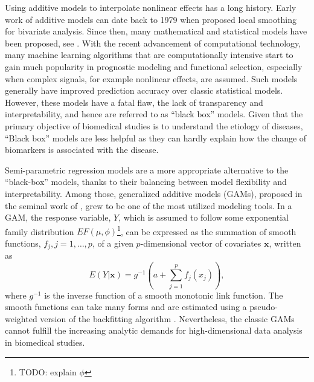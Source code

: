 \documentclass[AMA,STIX1COL,]{WileyNJD-v2}
\begin{document}
Using additive models to interpolate nonlinear effects has a long
history. Early work of additive models can date back to 1979 when
\citet{Cleveland1979} proposed local smoothing for bivariate analysis.
Since then, many mathematical and statistical models have been proposed,
see \citet{Wood2020}. With the recent advancement of computational
technology, many machine learning algorithms that are computationally
intensive start to gain much popularity in prognostic modeling and
functional selection, especially when complex signals, for example
nonlinear effects, are assumed. Such models generally have improved
prediction accuracy over classic statistical models. However, these
models have a fatal flaw, the lack of transparency and interpretability,
and hence are referred to as ``black box'' models. Given that the
primary objective of biomedical studies is to understand the etiology of
diseases, ``Black box'' models are less helpful as they can hardly
explain how the change of biomarkers is associated with the disease.

Semi-parametric regression models are a more appropriate alternative to
the ``black-box'' models, thanks to their balancing between model
flexibility and interpretability. Among those, generalized additive
models (GAMs), proposed in the seminal work of \citet{Hastie1987}, grew
to be one of the most utilized modeling tools. In a GAM, the response
variable, \(Y\), which is assumed to follow some exponential family
distribution \(EF(\mu, \phi)\)\footnote{TODO: explain \(\phi\)}, can be
expressed as the summation of smooth functions,
\(f_j, j = 1, \dots, p\), of a given \(p\)-dimensional vector of
covariates \(\boldsymbol{x}\), written as \[
E(Y|\boldsymbol{x}) = g^{-1}(a + \sum\limits^p_{j=1}f_j(x_j)),
\] where \(g^{-1}\) is the inverse function of a smooth monotonic link
function. The smooth functions can take many forms and are estimated
using a pseudo-weighted version of the backfitting algorithm
\citep{Breiman1985}. Nevertheless, the classic GAMs cannot fulfill the
increasing analytic demands for high-dimensional data analysis in
biomedical studies.
\end{document}
